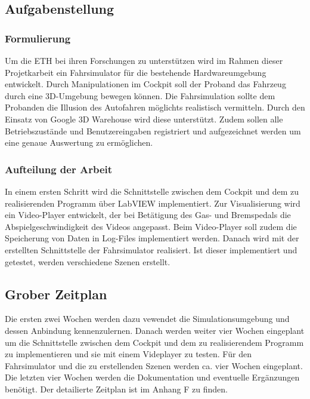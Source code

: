 \subsection{Aufgabenstellung}
\subsubsection{Formulierung}
Um die ETH bei ihren Forschungen zu unterstützen wird im Rahmen dieser Projetkarbeit ein Fahrsimulator für die bestehende Hardwareumgebung entwickelt. Durch Manipulationen im Cockpit soll der Proband das Fahrzeug durch eine 3D-Umgebung bewegen können. Die Fahrsimulation sollte dem Probanden die Illusion des Autofahren möglichts realistisch vermitteln. Durch den Einsatz von Google 3D Warehouse wird diese unterstützt. Zudem sollen alle Betriebszustände und Benutzereingaben registriert und aufgezeichnet werden um eine genaue Auswertung zu ermöglichen. 

\subsubsection{Aufteilung der Arbeit}
In einem ersten Schritt wird die Schnittstelle zwischen dem Cockpit und dem zu realisierenden Programm über LabVIEW implementiert. Zur Visualisierung wird ein Video-Player entwickelt, der bei Betätigung des Gas- und Bremspedals die Abspielgeschwindigkeit des Videos angepasst. Beim Video-Player soll zudem die Speicherung von Daten in Log-Files  implementiert werden. Danach wird mit der erstellten Schnittstelle der Fahrsimulator realisiert. Ist dieser implementiert und getestet, werden verschiedene Szenen erstellt. 

\subsection{Grober Zeitplan}
Die ersten zwei Wochen werden dazu vewendet die Simulationsumgebung und dessen Anbindung kennenzulernen. Danach werden weiter vier Wochen eingeplant um die Schnittstelle zwischen dem Cockpit und dem zu realisierendem Programm zu implementieren und sie mit einem Videplayer zu testen. Für den Fahrsimulator und die zu erstellenden Szenen werden ca. vier Wochen eingeplant. Die letzten vier Wochen werden die Dokumentation und eventuelle Ergänzungen benötigt. Der detailierte Zeitplan ist im Anhang F zu finden. 